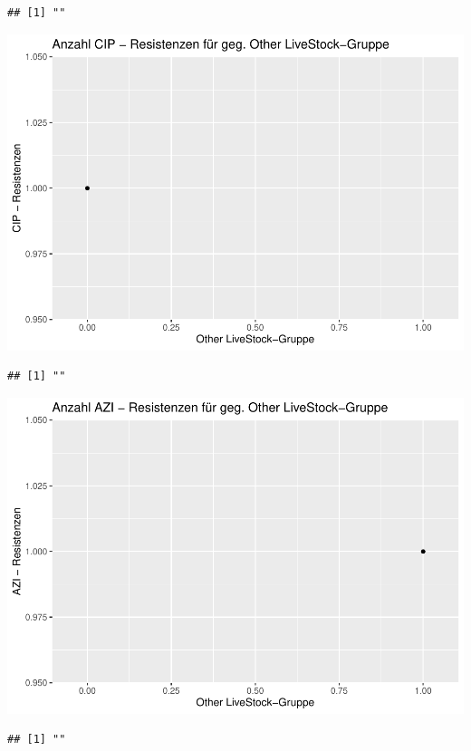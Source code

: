 \documentclass[
]{article}
\begin{document}
\begin{verbatim}
## [1] ""
\end{verbatim}

\includegraphics{NResistenzen_files/figure-latex/unnamed-chunk-7-12.pdf}

\begin{verbatim}
## [1] ""
\end{verbatim}

\includegraphics{NResistenzen_files/figure-latex/unnamed-chunk-7-13.pdf}

\begin{verbatim}
## [1] ""
\end{verbatim}
\end{document}
